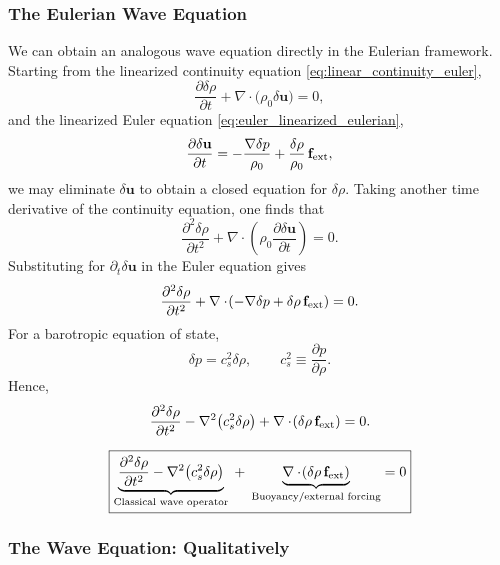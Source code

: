 \subsubsection*{The Eulerian Wave Equation}

We can obtain an analogous wave equation directly in the Eulerian framework. Starting from the linearized continuity equation \eqref{eq:linear_continuity_euler},
\[
\frac{\partial \delta \rho}{\partial t} + \nabla \cdot \big(\rho_0 \delta \mathbf{u}\big) = 0,
\]
and the linearized Euler equation \eqref{eq:euler_linearized_eulerian},
\[
\frac{\partial \delta \mathbf{u}}{\partial t} = - \frac{\nabla \delta p}{\rho_0} 
+ \frac{\delta \rho}{\rho_0}\, \mathbf{f}_{\rm ext},
\]
we may eliminate $\delta \mathbf{u}$ to obtain a closed equation for $\delta \rho$. Taking another time derivative of the continuity equation, one finds that
\[
\frac{\partial^2 \delta \rho}{\partial t^2}
+ \nabla \cdot \!\left( \rho_0 \frac{\partial \delta \mathbf{u}}{\partial t} \right) = 0.
\]
Substituting for $\partial_t \delta \mathbf{u}$ in the Euler equation gives
\[
\frac{\partial^2 \delta \rho}{\partial t^2}
+ \nabla \cdot \!\left( - \nabla \delta p + \delta \rho\, \mathbf{f}_{\rm ext} \right) = 0.
\]
For a barotropic equation of state, 
\[
\delta p = c_s^2 \delta \rho, 
\qquad 
c_s^2 \equiv \frac{\partial p}{\partial \rho}.
\]
Hence,
\[
\frac{\partial^2 \delta \rho}{\partial t^2}
- \nabla^2 \!\left(c_s^2 \delta \rho\right)
+ \nabla \cdot \!\left( \delta \rho\, \mathbf{f}_{\rm ext} \right) = 0.
\]

\begin{equation}
\label{eq:eulerian_wave_equation}
\boxed{
\underbrace{\frac{\partial^2 \delta \rho}{\partial t^2} 
- \nabla^2 \!\left(c_s^2 \delta \rho\right)}_{\text{Classical wave operator}}
\;+\;
\underbrace{\nabla \cdot \!\left( \delta \rho\, \mathbf{f}_{\rm ext} \right)}_{\text{Buoyancy/external forcing}}
= 0
}
\end{equation}

\subsubsection{The Wave Equation: Qualitatively}

